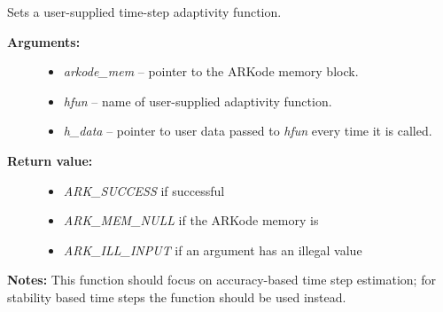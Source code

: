 \documentclass[letterpaper,10pt,english]{sphinxmanual}
\begin{document}

\begin{fulllineitems}
\label{c_interface/User_callable:c.ARKodeSetAdaptivityFn}
Sets a user-supplied time-step adaptivity function.
\begin{description}
\item[{\textbf{Arguments:}}] \leavevmode\begin{itemize}
\item {} 
\emph{arkode\_mem} -- pointer to the ARKode memory block.

\item {} 
\emph{hfun} -- name of user-supplied adaptivity function.

\item {} 
\emph{h\_data} -- pointer to user data passed to \emph{hfun} every time
it is called.

\end{itemize}

\item[{\textbf{Return value:}}] \leavevmode\begin{itemize}
\item {} 
\emph{ARK\_SUCCESS} if successful

\item {} 
\emph{ARK\_MEM\_NULL} if the ARKode memory is 

\item {} 
\emph{ARK\_ILL\_INPUT} if an argument has an illegal value

\end{itemize}

\end{description}

\textbf{Notes:} This function should focus on accuracy-based time step
estimation; for stability based time steps the function
{\hyperref[c_interface/User_callable:c.ARKodeSetStabilityFn]{\emph{}}} should be used instead.

\end{fulllineitems}

\end{document}
